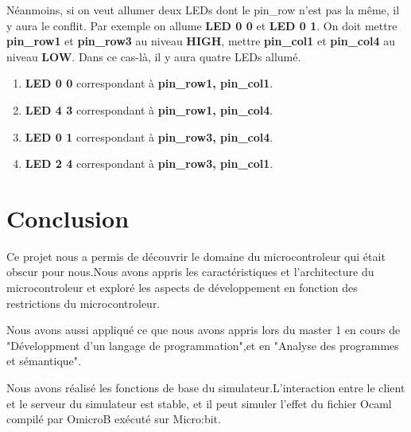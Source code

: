 \documentclass[14px]{article}
\begin{document}
Néanmoins, si on veut allumer deux LEDs dont le pin\_row n'est pas la même, il y aura le conflit. Par exemple on allume \textbf{LED 0 0} et \textbf{LED 0 1}. On doit mettre \textbf{pin\_row1} et \textbf{pin\_row3} au niveau \textbf{HIGH}, mettre \textbf{pin\_col1} et \textbf{pin\_col4} au niveau \textbf{LOW}. Dans ce cas-là, il y aura quatre LEDs allumé.
\begin{enumerate}
	\item \textbf{LED 0 0} correspondant à \textbf{pin\_row1, pin\_col1}.
	\item \textbf{LED 4 3} correspondant à \textbf{pin\_row1, pin\_col4}.
	\item \textbf{LED 0 1} correspondant à \textbf{pin\_row3, pin\_col4}.
	\item \textbf{LED 2 4} correspondant à \textbf{pin\_row3, pin\_col1}.
\end{enumerate}
\begin{figure}[htbp]
\end{figure}

\section{Conclusion}
Ce projet nous a permis de découvrir le domaine du microcontroleur qui était obscur pour nous.Nous avons appris les caractéristiques et l'architecture du microcontroleur et exploré les aspects de développement en fonction des restrictions du microcontroleur.

Nous avons aussi appliqué ce que nous avons appris lors du master 1 en cours de "Développment d'un langage de programmation",et en "Analyse des programmes et sémantique".

Nous avons réalisé les fonctions de base du simulateur.L'interaction entre le client et le serveur du simulateur est stable, et il peut simuler l'effet du fichier Ocaml compilé par OmicroB exécuté sur Micro:bit.
\end{document}
